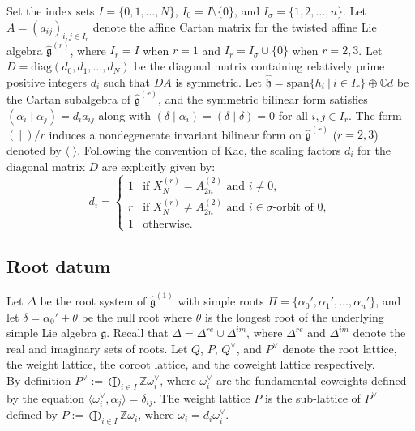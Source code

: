 \documentclass[12pt]{amsart}
\numberwithin{equation}{section}
\newcommand{\Z}{\ensuremath{\mathbb{Z}}}
\newcommand{\C}{\ensuremath{\mathbb{C}}}
\newcommand{\g}{\ensuremath{\mathfrak{g}}}
\newcommand{\h}{\ensuremath{\mathfrak{h}}}
\begin{document}
Set the index sets $I=\{0, 1, \dots, N\}$, $I_0 = I \setminus \{0\}$, and $I_\sigma = \{1, 2, \dots, n\}$. Let $A=(a_{ij})_{i,j\in I_r}$ denote the affine Cartan matrix for the twisted affine Lie algebra $\hat{\g}^{(r)}$, where $I_r=I$ when $r=1$ and $I_r=I_\sigma\cup\{0\}$ when $r=2,3$. Let $D = \text{diag}(d_0, d_1, \dots, d_N)$ be the diagonal matrix containing relatively prime positive integers $d_i$ such that $DA$ is symmetric. Let $\hat{\h} = \text{span}\{h_i \ |\ i\in I_r \}\oplus \C d$ be the  Cartan subalgebra of $\hat{\g}^{(r)}$, and the symmetric bilinear form satisfies $(\alpha_i \mid \alpha_j) = d_i a_{ij}$ along with $(\delta \mid \alpha_i) = (\delta \mid \delta) = 0$ for all $i,j \in I_r$. The form $( \ | \ ) / r$ induces a nondegenerate invariant bilinear form on $\hat{\g}^{(r)}$ ($r=2,3$) denoted by $\langle | \rangle$. Following the convention of Kac, the scaling factors $d_i$ for the diagonal matrix $D$ are explicitly given by:
$$ d_i = \begin{cases} 
1 & \text{if } X_N^{(r)} = A_{2n}^{(2)} \text{ and } i \neq 0, \\
r & \text{if } X_N^{(r)} \neq A_{2n}^{(2)} \text{ and } i \in \sigma\text{-orbit of } 0, \\
1 & \text{otherwise.}
\end{cases} $$

\subsection{Root datum} Let $\Delta$  be the root system of $\hat{\g}^{(1)}$ with simple roots $\Pi=\{\alpha_0', \alpha_1', \ldots, \alpha_n'\}$, and let $\delta=\alpha_0'+\theta$ be the null root where $\theta$ is the longest root of the underlying simple Lie algebra $\g$. Recall that $\Delta = \Delta^{re} \cup \Delta^{im}$, where $\Delta^{re}$ and $\Delta^{im}$ denote the real and imaginary sets of roots. Let $Q$, $P$, $Q^{\vee}$, and $P^{\vee}$ denote the root lattice, the weight lattice, the coroot lattice, and the coweight lattice respectively.\\

By definition $P^{\vee} := \bigoplus_{i\in I}\Z \omega_i^{\vee}$, where $\omega_i^{\vee}$ are the fundamental coweights defined by the equation $\langle \omega_i^{\vee} , \alpha_j \rangle = \delta_{ij}$. The weight lattice $P$ is the sub-lattice of $P^{\vee}$ defined by $P := \bigoplus_{i\in I}\Z \omega_i$, where $\omega_i = d_i\omega_i^{\vee}$.\\
\end{document}
